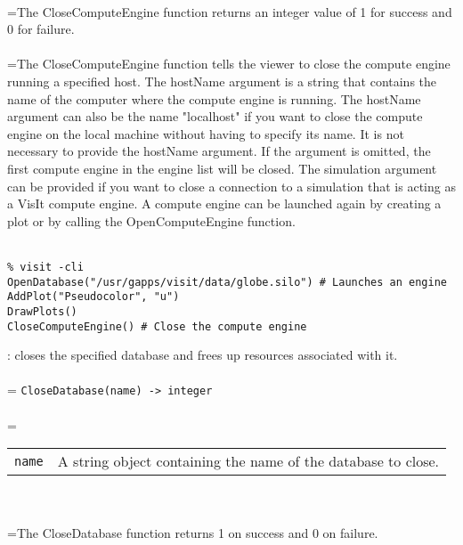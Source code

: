 \documentclass[10pt,a4paper]{report}
\begin{document}
 \\ 
\hangindent=\parindent The CloseComputeEngine function returns an integer value of 1 for success and 0 for failure. \\[-3mm] 

 \\ 
\hangindent=\parindent The CloseComputeEngine function tells the viewer to close the compute engine running a specified host. The hostName argument is a string that contains the name of the computer where the compute engine is running. The hostName argument can also be the name "localhost" if you want to close the compute engine on the local machine without having to specify its name. It is not necessary to provide the hostName argument. If the argument is omitted, the first compute engine in the engine list will be closed. The simulation argument can be provided if you want to close a connection to a simulation that is acting as a VisIt compute engine. A compute engine can be launched again by creating a plot or by calling the OpenComputeEngine function. \\[-3mm] 

\\[-6mm]
\begin{verbatim}% visit -cli
OpenDatabase("/usr/gapps/visit/data/globe.silo") # Launches an engine
AddPlot("Pseudocolor", "u")
DrawPlots()
CloseComputeEngine() # Close the compute engine
\end{verbatim}
\newpage


{}
: closes the specified database and frees up resources associated with it.\\[-3mm]

 \\ 
\hangindent=\parindent 
\verb!CloseDatabase(name) -> integer!\\ [-3mm]

 \\ 
\hangindent=\parindent 
\begin{tabular}{lp{9cm}}
\verb!name! & A string object containing the name of the database to close. \\
\end{tabular} \\[-2mm]


 \\ 
\hangindent=\parindent The CloseDatabase function returns 1 on success and 0 on failure. \\[-3mm] 
\end{document}
